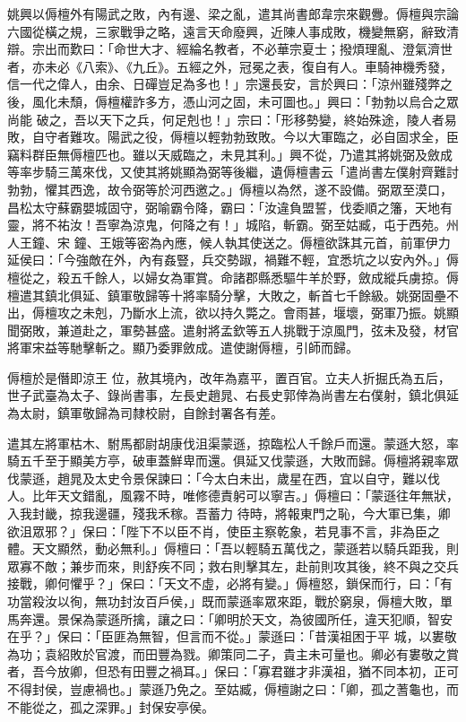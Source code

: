 \begin{pinyinscope}
 姚興以傉檀外有陽武之敗，內有邊、梁之亂，遣其尚書郎韋宗來觀釁。傉檀與宗論六國從橫之規，三家戰爭之略，遠言天命廢興，近陳人事成敗，機變無窮，辭致清辯。宗出而歎曰：「命世大才、經綸名教者，不必華宗夏士；撥煩理亂、澄氣濟世者，亦未必《八索》、《九丘》。五經之外，冠冕之表，復自有人。車騎神機秀發，信一代之偉人，由余、日磾豈足為多也！」宗還長安，言於興曰：「涼州雖殘弊之後，風化未頹，傉檀權詐多方，憑山河之固，未可圖也。」興曰：「勃勃以烏合之眾尚能
 破之，吾以天下之兵，何足剋也！」宗曰：「形移勢變，終始殊途，陵人者易敗，自守者難攻。陽武之役，傉檀以輕勃勃致敗。今以大軍臨之，必自固求全，臣竊料群臣無傉檀匹也。雖以天威臨之，未見其利。」興不從，乃遣其將姚弼及斂成等率步騎三萬來伐，又使其將姚顯為弼等後繼，遺傉檀書云「遣尚書左僕射齊難討勃勃，懼其西逸，故令弼等於河西邀之。」傉檀以為然，遂不設備。弼眾至漠口，昌松太守蘇霸嬰城固守，弼喻霸令降，霸曰：「汝違負盟誓，伐委順之籓，天地有靈，將不祐汝！吾寧為涼鬼，何降之有！」城陷，斬霸。弼至姑臧，屯于西苑。州人王鐘、宋
 鐘、王娥等密為內應，候人執其使送之。傉檀欲誅其元首，前軍伊力延侯曰：「今強敵在外，內有姦豎，兵交勢踧，禍難不輕，宜悉坑之以安內外。」傉檀從之，殺五千餘人，以婦女為軍賞。命諸郡縣悉驅牛羊於野，斂成縱兵虜掠。傉檀遣其鎮北俱延、鎮軍敬歸等十將率騎分擊，大敗之，斬首七千餘級。姚弼固壘不出，傉檀攻之未剋，乃斷水上流，欲以持久斃之。會雨甚，堰壞，弼軍乃振。姚顯聞弼敗，兼道赴之，軍勢甚盛。遣射將孟欽等五人挑戰于涼風門，弦未及發，材官將軍宋益等馳擊斬之。顯乃委罪斂成。遣使謝傉檀，引師而歸。



 傉檀於是僭即涼王
 位，赦其境內，改年為嘉平，置百官。立夫人折掘氏為五后，世子武臺為太子、錄尚書事，左長史趙晁、右長史郭倖為尚書左右僕射，鎮北俱延為太尉，鎮軍敬歸為司隸校尉，自餘封署各有差。



 遣其左將軍枯木、駙馬都尉胡康伐沮渠蒙遜，掠臨松人千餘戶而還。蒙遜大怒，率騎五千至于顯美方亭，破車蓋鮮卑而還。俱延又伐蒙遜，大敗而歸。傉檀將親率眾伐蒙遜，趙晁及太史令景保諫曰：「今太白未出，歲星在西，宜以自守，難以伐人。比年天文錯亂，風霧不時，唯修德責躬可以寧吉。」傉檀曰：「蒙遜往年無狀，入我封畿，掠我邊疆，殘我禾稼。吾蓄力
 待時，將報東門之恥，今大軍已集，卿欲沮眾邪？」保曰：「陛下不以臣不肖，使臣主察乾象，若見事不言，非為臣之體。天文顯然，動必無利。」傉檀曰：「吾以輕騎五萬伐之，蒙遜若以騎兵距我，則眾寡不敵；兼步而來，則舒疾不同；救右則擊其左，赴前則攻其後，終不與之交兵接戰，卿何懼乎？」保曰：「天文不虛，必將有變。」傉檀怒，鎖保而行，曰：「有功當殺汝以徇，無功封汝百戶侯，」既而蒙遜率眾來距，戰於窮泉，傉檀大敗，單馬奔還。景保為蒙遜所擒，讓之曰：「卿明於天文，為彼國所任，違天犯順，智安在乎？」保曰：「臣匪為無智，但言而不從。」蒙遜曰：「昔漢祖困于平
 城，以婁敬為功；袁紹敗於官渡，而田豐為戮。卿策同二子，貴主未可量也。卿必有婁敬之賞者，吾今放卿，但恐有田豐之禍耳。」保曰：「寡君雖才非漢祖，猶不同本初，正可不得封侯，豈慮禍也。」蒙遜乃免之。至姑臧，傉檀謝之曰：「卿，孤之蓍龜也，而不能從之，孤之深罪。」封保安亭侯。




\end{pinyinscope}
